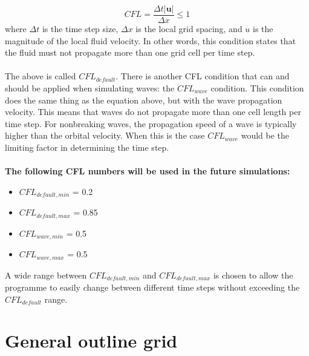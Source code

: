 \begin{equation}
    CFL = \frac{ \Delta t |\mathbf{u}|}{\Delta x} \leq 1
\end{equation}
where $\Delta t$ is the time step size, $\Delta x$ is the local grid spacing, and $u$ is the magnitude of the local fluid velocity. In other words, this condition states that the fluid must not propagate more than one grid cell per time step. \\
\\
The above is called $CFL_{default}$. There is another CFL condition that can and should be applied when simulating waves: the $CFL_{wave}$ condition. This condition does the same thing as the equation above, but with the wave propagation velocity. This means that waves do not propagate more than one cell length per time step. For nonbreaking waves, the propagation speed of a wave is typically higher than the orbital velocity. When this is the case $CFL_{wave}$ would be the limiting factor in determining the time step.\\
\\
\textbf{The following CFL numbers will be used in the future simulations:}
\begin{itemize}
    \item $CFL_{default, min}$ = 0.2
    \item $CFL_{default, max}$ = 0.85
    \item $CFL_{wave, min}$ = 0.5
    \item $CFL_{wave, max}$ = 0.5
\end{itemize}

A wide range between $CFL_{default, min}$ and $CFL_{default, max}$ is chosen to allow the programme to easily change between different time steps without exceeding the $CFL_{default}$ range.


\section{General outline grid}
\label{sec: general outline grid}



